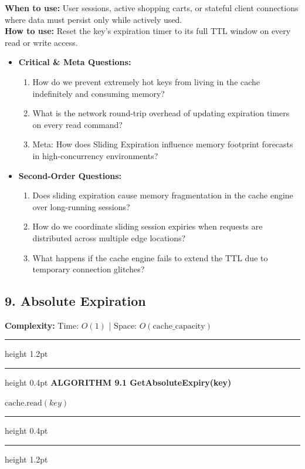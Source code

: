 \documentclass[11pt,a4paper]{article}
\newenvironment{textbookalgo}[2]{%
  \par\addvspace{1.2em}\noindent
  \hrule height 1.2pt
  \vspace{1.5pt}
  \hrule height 0.4pt
  \vspace{5pt}
  {\noindent\large\bfseries\sffamily ALGORITHM #1 \quad #2}
  \par\vspace{5pt}
  \RestyleAlgo{plain}
}{%
  \par\vspace{4pt}
  \hrule height 0.4pt
  \vspace{1.5pt}
  \hrule height 1.2pt
  \par\addvspace{1.2em}
}
\theoremstyle{definition}
\begin{document}
\noindent
\textbf{When to use:} User sessions, active shopping carts, or stateful client connections where data must persist only while actively used.\\
\textbf{How to use:} Reset the key's expiration timer to its full TTL window on every read or write access.
\begin{itemize}[leftmargin=*]
  \item[] \textbf{Critical \& Meta Questions:}
  \begin{enumerate}
  \item How do we prevent extremely hot keys from living in the cache indefinitely and consuming memory?
  \item What is the network round-trip overhead of updating expiration timers on every read command?
  \item Meta: How does Sliding Expiration influence memory footprint forecasts in high-concurrency environments?
  \end{enumerate}
  \item[] \textbf{Second-Order Questions:}
  \begin{enumerate}
  \item Does sliding expiration cause memory fragmentation in the cache engine over long-running sessions?
  \item How do we coordinate sliding session expiries when requests are distributed across multiple edge locations?
  \item What happens if the cache engine fails to extend the TTL due to temporary connection glitches?
  \end{enumerate}
\end{itemize}
\medskip

\clearpage
\subsection{9. Absolute Expiration}

\noindent
\textbf{Complexity:} Time: $O(1)$ | Space: $O(\text{cache\_capacity})$
\smallskip

\begin{textbookalgo}{9.1}{GetAbsoluteExpiry(key)}
\begin{algorithm}[H]
\Return $\text{cache.read}(key)$\;
\end{algorithm}
\end{textbookalgo}
\end{document}
